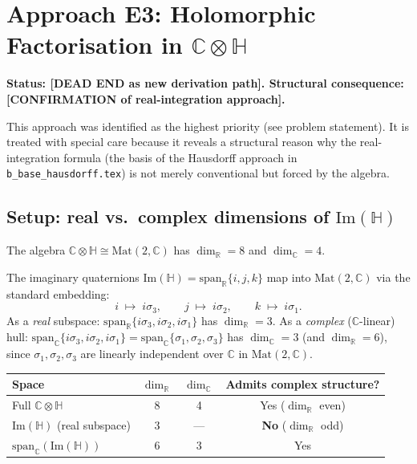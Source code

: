 \documentclass[11pt,a4paper]{article}
\theoremstyle{definition}
\theoremstyle{remark}
\begin{document}
\section{Approach E3: Holomorphic Factorisation in $\mathbb{C}\otimes\mathbb{H}$}
\label{sec:E3_holomorphic}

\textbf{Status: [DEAD END as new derivation path].
Structural consequence: [CONFIRMATION of real-integration approach].}

This approach was identified as the highest priority (see problem statement).
It is treated with special care because it reveals a structural reason why the
real-integration formula (the basis of the Hausdorff approach in
\texttt{b\_base\_hausdorff.tex}) is not merely conventional but forced by
the algebra.

\subsection{Setup: real vs.\ complex dimensions of $\mathrm{Im}(\mathbb{H})$}

The algebra $\mathbb{C}\otimes\mathbb{H} \cong \mathrm{Mat}(2,\mathbb{C})$ has
$\dim_\mathbb{R} = 8$ and $\dim_\mathbb{C} = 4$.

The imaginary quaternions $\mathrm{Im}(\mathbb{H}) = \mathrm{span}_\mathbb{R}\{i,j,k\}$
map into $\mathrm{Mat}(2,\mathbb{C})$ via the standard embedding:
\begin{equation}
  i \;\mapsto\; i\sigma_3,
  \qquad
  j \;\mapsto\; i\sigma_2,
  \qquad
  k \;\mapsto\; i\sigma_1.
  \label{eq:ImH_embedding}
\end{equation}
As a \emph{real} subspace: $\mathrm{span}_\mathbb{R}\{i\sigma_3, i\sigma_2, i\sigma_1\}$
has $\dim_\mathbb{R} = 3$.
As a \emph{complex} ($\mathbb{C}$-linear) hull: $\mathrm{span}_\mathbb{C}\{i\sigma_3, i\sigma_2, i\sigma_1\}
= \mathrm{span}_\mathbb{C}\{\sigma_1,\sigma_2,\sigma_3\}$ has $\dim_\mathbb{C} = 3$
(and $\dim_\mathbb{R} = 6$), since $\sigma_1,\sigma_2,\sigma_3$ are linearly
independent over $\mathbb{C}$ in $\mathrm{Mat}(2,\mathbb{C})$.

\begin{center}
\begin{tabular}{lccc}
  \toprule
  Space & $\dim_\mathbb{R}$ & $\dim_\mathbb{C}$ & Admits complex structure? \\
  \midrule
  Full $\mathbb{C}\otimes\mathbb{H}$         & 8 & 4 & Yes ($\dim_\mathbb{R}$ even) \\
  $\mathrm{Im}(\mathbb{H})$ (real subspace) & 3 & — & \textbf{No} ($\dim_\mathbb{R}$ odd) \\
  $\mathrm{span}_\mathbb{C}(\mathrm{Im}(\mathbb{H}))$ & 6 & 3 & Yes \\
  \bottomrule
\end{tabular}
\end{center}
\end{document}
